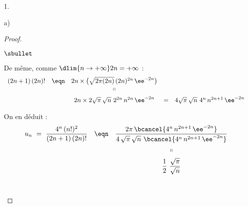 \documentclass[11pt]{article}%
\begin{document}
\begin{noliste}{1.}
\begin{noliste}{a)}
\begin{proof}
\begin{noliste}{$\sbullet$}
        \newpage
        
        
      \item De même, comme $\dlim{n\to +\infty} 2n = +\infty$ :
        \[
          \begin{array}{ccccc}
            (2n+1) \, (2n)!
            & \eqn & 2n \times \big( \sqrt{2 \pi (2n)} \, (2n)^{2n} \,
                     \ee^{-2n} \big)
            \\
            & & \shortparallel
            \\[.2cm]
            & & 2n \times 2 \sqrt{\pi} \, \sqrt{n} \ 2^{2n} \, n^{2n}
            \, \ee^{-2n} 
            & = & 4 \sqrt{\pi} \, \sqrt{n} \ 4^n \, n^{2n+1} \, \ee^{-2n}
          \end{array}
        \]
        
      \item On en déduit :
        \[
          \begin{array}{ccc}
            u_n \ = \ \dfrac{4^n \, (n!)^2}{(2n+1) \, (2n)!} & \eqn &
            \dfrac{2 \pi \, \bcancel{4^n \, n^{2n+1} \, \ee^{-2n}}}{4 \,
            \sqrt{\pi} \, \sqrt{n} \ \bcancel{4^n \, n^{2n+1} \, \ee^{-2n}}}
            \\[.4cm]
            & & \shortparallel
            \\[.2cm]
            & & \dfrac{1}{2} \ \dfrac{\sqrt{\pi}}{\sqrt{n}}
          \end{array}
        \]
        ~\\[-1.4cm]
      \end{noliste}
    \end{proof}
  \end{noliste}
    

\end{noliste}
\end{document}
